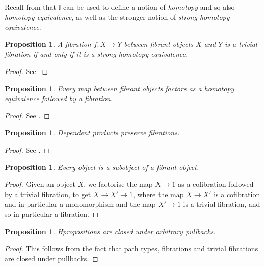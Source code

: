 \documentclass[a4paper]{amsart}
\newtheorem{proposition}[theorem]{Proposition}
\theoremstyle{definition}
\newcommand{\intv}{\mathbb{I}}
\begin{document}
Recall from \cite[Section 3.1]{vdbergfrumin} that $\intv$ can be used
to define a notion of \emph{homotopy} and so also \emph{homotopy
  equivalence}, as well as the stronger notion of \emph{strong
  homotopy equivalence}.

\begin{proposition}
  \label{prop:trivfibshe}
  A fibration $f \colon X \to Y$ between fibrant objects $X$ and $Y$
  is a trivial fibration if and only if it is a strong homotopy
  equivalence.
\end{proposition}

\begin{proof}
  See \cite[Proposition 4.1]{vdbergfrumin}
\end{proof}

\begin{proposition}
  \label{prop:mappingpathfact}
  Every map between fibrant objects factors as a homotopy equivalence
  followed by a fibration.
\end{proposition}

\begin{proof}
  See \cite[Proposition 4.3]{vdbergfrumin}.
\end{proof}

\begin{proposition}
  Dependent products preserve fibrations.
\end{proposition}

\begin{proof}
  See \cite[Proposition 4.5]{vdbergfrumin}.
\end{proof}

\begin{proposition}
  \label{prop:embedinfibrant}
  Every object is a subobject of a fibrant object.
\end{proposition}

\begin{proof}
  Given an object $X$, we factorise the map $X \to 1$ as a cofibration
  followed by a trivial fibration, to get $X \to X' \to 1$, where the
  map $X \to X'$ is a cofibration and in particular a monomorphism and
  the map $X' \to 1$ is a trivial fibration, and so in particular a
  fibration.
\end{proof}

\begin{proposition}
  Hpropositions are closed under arbitrary pullbacks.
\end{proposition}

\begin{proof}
  This follows from the fact that path types, fibrations and trivial
  fibrations are closed under pullbacks.
\end{proof}
\end{document}
